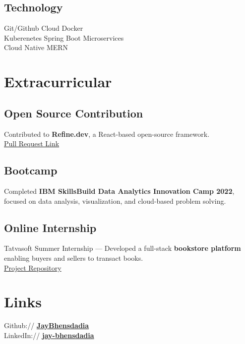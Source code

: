\documentclass[]{deedy-resume-reversed}
\begin{document}
\begin{minipage}[t]{0.33\textwidth}
\subsection{Technology}
Git/Github \textbullet{} Cloud \textbullet{} Docker \\
Kuberenetes \textbullet{} Spring Boot \textbullet{} Microservices \\
Cloud Native \textbullet{} MERN \\
\sectionsep


\section{Extracurricular}
\subsection{Open Source Contribution}
Contributed to \textbf{Refine.dev}, a React-based open-source framework. \\
\href{https://github.com/refinedev/refine/pull/6021}{Pull Request Link}
\sectionsep

\subsection{Bootcamp}
Completed \textbf{IBM SkillsBuild Data Analytics Innovation Camp 2022}, focused on data analysis, visualization, and cloud-based problem solving.
\sectionsep

\subsection{Online Internship}
Tatvasoft Summer Internship — Developed a full-stack \textbf{bookstore platform} enabling buyers and sellers to transact books. \\
\href{https://github.com/JayBhensdadia/Tatvasoft}{Project Repository}
\sectionsep





\section{Links}
Github:// \href{https://github.com/jaybhensdadia/}{\bf JayBhensdadia} \\
LinkedIn://  \href{https://www.linkedin.com/in/jay-bhensdadia/}{\bf jay-bhensdadia}
\sectionsep

\end{minipage}
\end{document}
